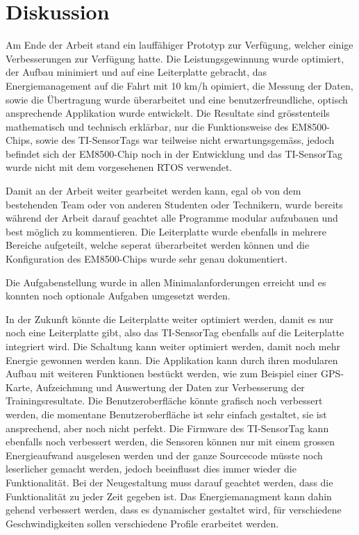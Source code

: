 \chapter{Diskussion}

Am Ende der Arbeit stand ein lauffähiger Prototyp zur Verfügung, welcher einige Verbesserungen zur Verfügung hatte. Die Leistungsgewinnung wurde optimiert, der Aufbau minimiert und auf eine Leiterplatte gebracht, das Energiemanagement auf die Fahrt mit 10 km/h opimiert, die Messung der Daten, sowie die Übertragung wurde überarbeitet und eine benutzerfreundliche, optisch ansprechende Applikation wurde entwickelt. Die Resultate sind grösstenteils mathematisch und technisch erklärbar, nur die Funktionsweise des EM8500-Chips, sowie des TI-SensorTags war teilweise nicht erwartungsgemäss, jedoch befindet sich der EM8500-Chip noch in der Entwicklung und das TI-SensorTag wurde nicht mit dem vorgesehenen RTOS verwendet.

Damit an der Arbeit weiter gearbeitet werden kann, egal ob von dem bestehenden Team oder von anderen Studenten oder Technikern, wurde bereits während der Arbeit darauf geachtet alle Programme modular aufzubauen und best möglich zu kommentieren. Die Leiterplatte wurde ebenfalls in mehrere Bereiche aufgeteilt, welche seperat überarbeitet werden können und die Konfiguration des EM8500-Chips wurde sehr genau dokumentiert.

Die Aufgabenstellung wurde in allen Minimalanforderungen erreicht und es konnten noch optionale Aufgaben umgesetzt werden.

In der Zukunft könnte die Leiterplatte weiter optimiert werden, damit es nur noch eine Leiterplatte gibt, also das TI-SensorTag ebenfalls auf die Leiterplatte integriert wird. Die Schaltung kann weiter optimiert werden, damit noch mehr Energie gewonnen werden kann. Die Applikation kann durch ihren modularen Aufbau mit weiteren Funktionen bestückt werden, wie zum Beispiel einer GPS-Karte, Aufzeichnung und Auswertung der Daten zur Verbesserung der Trainingsresultate. Die Benutzeroberfläche könnte grafisch noch verbessert werden, die momentane Benutzeroberfläche ist sehr einfach gestaltet, sie ist ansprechend, aber noch nicht perfekt. Die Firmware des TI-SensorTag kann ebenfalls noch verbessert werden, die Sensoren können nur mit einem grossen Energieaufwand ausgelesen werden und der ganze Sourcecode müsste noch leserlicher gemacht werden, jedoch beeinflusst dies immer wieder die Funktionalität. Bei der Neugestaltung muss darauf geachtet werden, dass die Funktionalität zu jeder Zeit gegeben ist. Das Energiemanagment kann dahin gehend verbessert werden, dass es dynamischer gestaltet wird, für verschiedene Geschwindigkeiten sollen verschiedene Profile erarbeitet werden.

